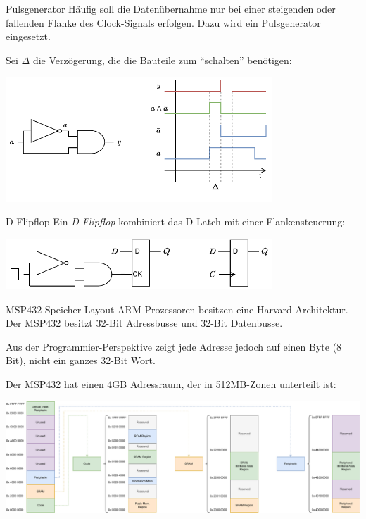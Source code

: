 \begin{defi}{Pulsgenerator}
    Häufig soll die Datenübernahme nur bei einer steigenden oder fallenden Flanke des Clock-Signals erfolgen.
    Dazu wird ein Pulsgenerator eingesetzt.

    Sei $\Delta$ die Verzögerung, die die Bauteile zum \enquote{schalten} benötigen:

    \begin{center}
        \includegraphics[width=0.75\textwidth]{includes/figures/defi_pulsgenerator.pdf}
    \end{center}
\end{defi}

\begin{defi}{D-Flipflop}
    Ein \emph{D-Flipflop} kombiniert das D-Latch mit einer Flankensteuerung:

    \begin{center}
        \includegraphics[width=0.75\textwidth]{includes/figures/defi_d_flipflop.pdf}
    \end{center}
\end{defi}

\begin{defi}{MSP432 Speicher Layout}
    ARM Prozessoren besitzen eine Harvard-Architektur.
    Der MSP432 besitzt 32-Bit Adressbusse und 32-Bit Datenbusse.

    Aus der Programmier-Perspektive zeigt jede Adresse jedoch auf einen Byte (8 Bit), nicht ein ganzes 32-Bit Wort.

    Der MSP432 hat einen 4GB Adressraum, der in 512MB-Zonen unterteilt ist:

    \includegraphics[width=\textwidth]{includes/figures/defi_msp432_speicher.pdf}
\end{defi}

